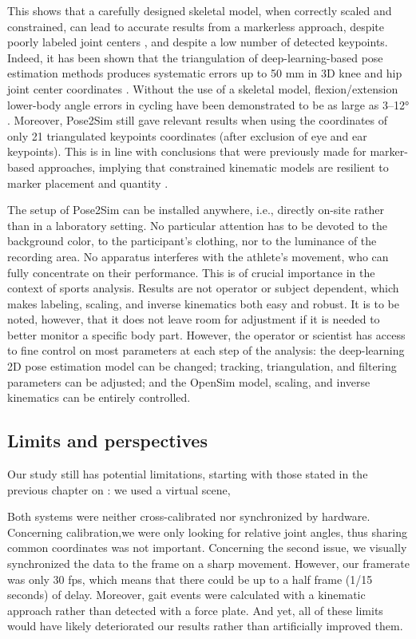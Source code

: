 This shows that a carefully designed skeletal model, when correctly scaled and constrained, can lead to accurate results from a markerless approach, despite poorly labeled joint centers \cite{Needham2021b, Wade2021}, and despite a low number of detected keypoints. Indeed, it has been shown that the triangulation of deep-learning-based pose estimation methods produces systematic errors up to 50 mm in 3D knee and hip joint center coordinates \cite{Needham2021b}. Without the use of a skeletal model, flexion/extension lower-body angle errors in cycling have been demonstrated to be as large as 3–12° \cite{Bini2021}. Moreover, Pose2Sim still gave relevant results when using the coordinates of only 21 triangulated keypoints coordinates (after exclusion of eye and ear keypoints). This is in line with conclusions that were previously made for marker-based approaches, implying that constrained kinematic models are resilient to marker placement and quantity \cite{Slater2018}.

The setup of Pose2Sim can be installed anywhere, i.e., directly on-site rather than in a laboratory setting. No particular attention has to be devoted to the background color, to the participant’s clothing, nor to the luminance of the recording area. No apparatus interferes with the athlete’s movement, who can fully concentrate on their performance. This is of crucial importance in the context of sports analysis. Results are not operator or subject dependent, which makes labeling, scaling, and inverse kinematics both easy and robust. It is to be noted, however, that it does not leave room for adjustment if it is needed to better monitor a specific body part. However, the operator or scientist has access to fine control on most parameters at each step of the analysis: the deep-learning 2D pose estimation model can be changed; tracking, triangulation, and filtering parameters can be adjusted; and the OpenSim model, scaling, and inverse kinematics can be entirely controlled.


\subsection{Limits and perspectives}

Our study still has potential limitations, starting with those stated in the previous chapter on : we used a virtual scene, 

Both systems were neither cross-calibrated nor synchronized by hardware. Concerning calibration,we were only looking for relative joint angles, thus sharing common coordinates was not important. Concerning the second issue, we visually synchronized the data to the frame on a sharp movement. However, our framerate was only 30 fps, which means that there could be up to a half frame (1/15 seconds) of delay. Moreover, gait events were calculated with a kinematic approach \cite{Zeni2008} rather than detected with a force plate. And yet, all of these limits would have likely deteriorated our results rather than artificially improved them. 

